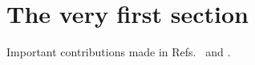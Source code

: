 \section{The very first section}

\lipsum[2-3]

Important contributions made in Refs.~\cite{Grassl1997} and \cite{Laflamme1996}. %
\lipsum[3-4]


